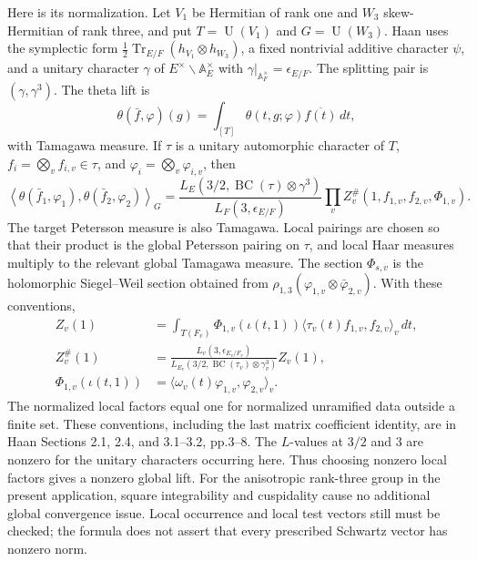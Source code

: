 \documentclass[11pt]{article}
\newcommand{\A}{\mathbb A}
\newcommand{\Tr}{\operatorname{Tr}}
\newcommand{\U}{\operatorname{U}}
\begin{document}
Here is its normalization. Let $V_1$ be Hermitian of rank one and $W_3$
skew-Hermitian of rank three, and put $T=\U(V_1)$ and $G=\U(W_3)$.
Haan uses the symplectic form
$\frac12\Tr_{E/F}(h_{V_1}\otimes h_{W_3})$, a fixed nontrivial additive
character $\psi$, and a unitary character $\gamma$ of
$E^\times\backslash\A_E^\times$ with
$\gamma|_{\A_F^\times}=\epsilon_{E/F}$. The splitting pair is
$(\gamma,\gamma^3)$. The theta lift is
\[
 \theta(\bar f,\varphi)(g)
 =\int_{[T]}\theta(t,g;\varphi)\overline{f(t)}\,dt,
\]
with Tamagawa measure. If $\tau$ is a unitary automorphic character of
$T$, $f_i=\bigotimes_v f_{i,v}\in\tau$, and
$\varphi_i=\bigotimes_v\varphi_{i,v}$, then
\begin{equation}\label{A-Rallis}
 \left\langle\theta(\bar f_1,\varphi_1),
                    \theta(\bar f_2,\varphi_2)\right\rangle_G
 =\frac{L_E(3/2,\operatorname{BC}(\tau)\otimes\gamma^3)}
        {L_F(3,\epsilon_{E/F})}
       \prod_v Z_v^{\#}(1,f_{1,v},f_{2,v},\Phi_{1,v}).
\end{equation}
The target Petersson measure is also Tamagawa. Local pairings are
chosen so that their product is the global Petersson pairing on
$\tau$, and local Haar measures multiply to the relevant global
Tamagawa measure. The section $\Phi_{s,v}$ is the holomorphic
Siegel--Weil section obtained from
$\rho_{1,3}(\varphi_{1,v}\otimes\bar\varphi_{2,v})$. With these
conventions,
\[
\begin{split}
 Z_v(1)&=\int_{T(F_v)}\Phi_{1,v}(\iota(t,1))
               \langle\tau_v(t)f_{1,v},f_{2,v}\rangle_v\,dt,\\
 Z_v^{\#}(1)&=
 \frac{L_v(3,\epsilon_{E_v/F_v})}
 {L_{E_v}(3/2,\operatorname{BC}(\tau_v)\otimes\gamma_v^3)}Z_v(1),\\
 \Phi_{1,v}(\iota(t,1))&=
       \langle\omega_v(t)\varphi_{1,v},\varphi_{2,v}\rangle_v.
\end{split}
\]
The normalized local factors equal one for normalized unramified data
outside a finite set. These conventions, including the last matrix
coefficient identity, are in Haan Sections 2.1, 2.4, and 3.1--3.2,
pp.3--8. The $L$-values at $3/2$ and $3$ are nonzero for the unitary
characters occurring here. Thus choosing nonzero local factors gives a
nonzero global lift. For the anisotropic rank-three group in the present
application, square integrability and cuspidality cause no additional
global convergence issue. Local occurrence and local test vectors still
must be checked; the formula does not assert that every prescribed
Schwartz vector has nonzero norm.
\end{document}
